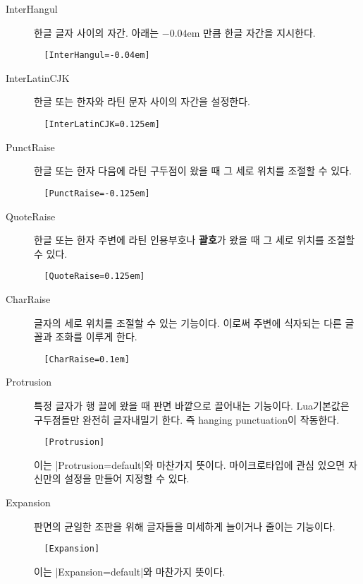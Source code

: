 \documentclass[a4paper]{article}
\def\hemph#1{\textsf{\bfseries #1}}
\begin{document}
\begin{description}
\item[InterHangul] 한글 글자 사이의 자간.  아래는 $-0.04$em 만큼 한글
  자간을 지시한다.
\begin{verbatim}
  [InterHangul=-0.04em]
\end{verbatim}

\item[InterLatinCJK] 한글 또는 한자와 라틴 문자 사이의 자간을
  설정한다.
\begin{verbatim}
  [InterLatinCJK=0.125em]
\end{verbatim}

\item[PunctRaise] 한글 또는 한자 다음에 라틴 구두점이 왔을 때 그 세로
  위치를 조절할 수 있다.
\begin{verbatim}
  [PunctRaise=-0.125em]
\end{verbatim}

\item[QuoteRaise] 한글 또는 한자 주변에 라틴 인용부호나 \hemph{괄호}가 왔을 때
  그 세로 위치를 조절할 수 있다.
\begin{verbatim}
  [QuoteRaise=0.125em]
\end{verbatim}

\item[CharRaise] 글자의 세로 위치를
  { 조절}할 수 있는 기능이다.
  이로써 주변에 식자되는 다른 글꼴과 조화를 이루게 한다.
\begin{verbatim}
  [CharRaise=0.1em]
\end{verbatim}

\item[Protrusion] 특정 글자가 행 끌에 왔을 때 판면 바깥으로 끌어내는
  기능이다.  Lua 기본값은 구두점들만 완전히 글자내밀기 한다. 즉
  hanging punctuation이 작동한다.
\begin{verbatim}
  [Protrusion]
\end{verbatim}
  이는 |Protrusion=default|와 마찬가지 뜻이다.  마이크로타입에 관심
  있으면 자신만의 설정을 만들어 지정할 수 있다.

\item[Expansion] 판면의 균일한 조판을 위해 글자들을 미세하게 늘이거나
  줄이는 기능이다.
\begin{verbatim}
  [Expansion]
\end{verbatim}
  이는 |Expansion=default|와 마찬가지 뜻이다.

\end{description}
\end{document}

